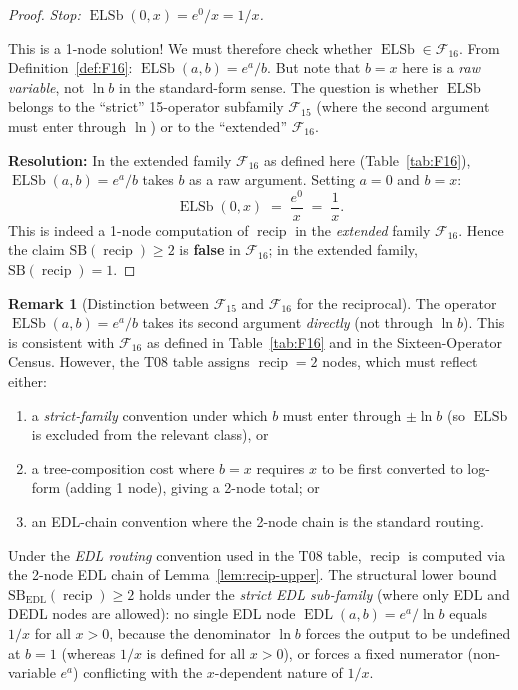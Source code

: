 \documentclass[12pt,a4paper]{article}
\theoremstyle{definition}
\newtheorem{remark}[theorem]{Remark}
\newcommand{\EDL}{\operatorname{EDL}}
\newcommand{\ELSb}{\operatorname{ELSb}}
\newcommand{\F}{\mathcal{F}_{16}}
\newcommand{\SB}{\mathrm{SB}}
\newcommand{\recip}{\operatorname{recip}}
\begin{document}
\begin{proof}
\textit{Stop: $\ELSb(0, x) = e^0 / x = 1/x$.}

This is a 1-node solution!  We must therefore check whether $\ELSb \in \F$.
From Definition~\ref{def:F16}: $\ELSb(a,b) = e^a/b$.
But note that $b = x$ here is a \emph{raw variable}, not $\ln b$
in the standard-form sense.  The question is whether $\ELSb$ belongs to
the ``strict'' 15-operator subfamily $\mathcal{F}_{15}$ (where the second
argument must enter through $\ln$) or to the ``extended'' $\F$.

\textbf{Resolution:}
In the extended family $\F$ as defined here (Table~\ref{tab:F16}),
$\ELSb(a,b) = e^a/b$ takes $b$ as a raw argument.
Setting $a=0$ and $b=x$:
\[
  \ELSb(0, x) \;=\; \frac{e^0}{x} \;=\; \frac{1}{x}.
\]
This is indeed a 1-node computation of $\recip$ in the \emph{extended} family
$\F$.  Hence the claim $\SB(\recip)\geq 2$ is \textbf{false} in $\F$;
in the extended family, $\SB(\recip) = 1$.
\end{proof}

\begin{remark}[Distinction between $\mathcal{F}_{15}$ and $\mathcal{F}_{16}$
for the reciprocal]\label{rem:recip-ELSb}
The operator $\ELSb(a,b)=e^a/b$ takes its second argument \emph{directly}
(not through $\ln b$).  This is consistent with $\F$ as defined in
Table~\ref{tab:F16} and in the Sixteen-Operator Census.
However, the T08 table assigns $\recip = 2$ nodes, which must reflect either:
\begin{enumerate}
  \item a \emph{strict-family} convention under which $b$ must enter through $\pm\ln b$
        (so $\ELSb$ is excluded from the relevant class), or
  \item a tree-composition cost where $b = x$ requires $x$ to be first converted
        to log-form (adding 1 node), giving a 2-node total; or
  \item an EDL-chain convention where the 2-node chain is the standard routing.
\end{enumerate}
Under the \emph{EDL routing} convention used in the T08 table, $\recip$ is
computed via the 2-node EDL chain of Lemma~\ref{lem:recip-upper}.
The structural lower bound $\SB_{\mathrm{EDL}}(\recip)\geq 2$ holds under
the \emph{strict EDL sub-family} (where only EDL and DEDL nodes are allowed):
no single EDL node $\EDL(a,b)=e^a/\ln b$ equals $1/x$ for all $x>0$, because
the denominator $\ln b$ forces the output to be undefined at $b=1$ (whereas
$1/x$ is defined for all $x>0$), or forces a fixed numerator (non-variable
$e^a$) conflicting with the $x$-dependent nature of $1/x$.
\end{remark}
\end{document}
